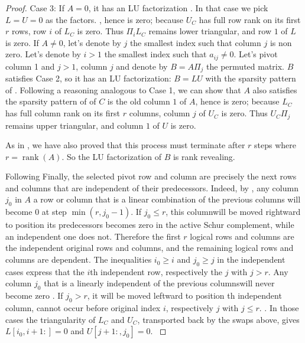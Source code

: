 \documentclass[10pt,twoside]{siamart1116}
\DeclareMathOperator{\rk}{rank}
\numberwithin{theorem}{section}
\providecommand{\DIFadd}[1]{{\protect\color{blue} \sf #1}} %
\providecommand{\DIFdel}[1]{{\protect\color{red} \scriptsize #1}} %
\providecommand{\DIFaddbegin}{} %
\providecommand{\DIFaddend}{} %
\providecommand{\DIFdelbegin}{} %
\providecommand{\DIFdelend}{} %
\begin{document}
\begin{proof}
\DIFdel{Case 3: If $A = 0$, it has an LU factorization . In that case we pick $L=U=0$ as the factors. }\DIFdelend \DIFaddbegin \DIFadd{, hence is zero; because $U_C$ has full row rank on its first $r$ rows, row $i$ of $L_C$ is zero. Thus $\Pi_i L_C$ remains lower triangular, and row $1$ of $L$ is zero. }\DIFaddend If \DIFdelbegin \DIFdel{$A \neq 0$, let's denote by $j$ the smallest index such that column $j$ is non zero. Let's denote by $i > 1$ the smallest index such that $a_{ij} \neq 0$. Let's pivot column 1 and }\DIFdelend \DIFaddbegin \DIFadd{$j>1$, column }\DIFaddend $j$ \DIFdelbegin \DIFdel{and denote by $B = A \Pi_j$ the permuted matrix. $B$ satisfies Case 2, so it has an LU factorization: $B = L U$ with the sparsity pattern of }%
\DIFdel{. Following a reasoning analogous to Case 1, we can show that $A$ also satisfies the sparsity pattern of }%
\DIFdelend \DIFaddbegin \DIFadd{of $C$ is the old column $1$ of $A$, hence is zero; because $L_C$ has full column rank on its first $r$ columns, column $j$ of $U_C$ is zero. Thus $U_C\Pi_j$ remains upper triangular, and column $1$ of $U$ is zero}\DIFaddend .

  \DIFdelbegin \DIFdel{As in }%
\DIFdel{, we have also proved that this process must terminate after $r$ steps where $r = \rk(A)$. So the LU factorization of $B$ is rank revealing. }%

\DIFdel{Following }\DIFdelend \DIFaddbegin \DIFadd{Finally, the selected pivot row and column are precisely the next rows and columns that are independent of their predecessors. Indeed, by }\DIFaddend {}, \DIFdelbegin \DIFdel{any column $j_0$ in $A$ }\DIFdelend \DIFaddbegin \DIFadd{a row or column }\DIFaddend that is a linear combination of \DIFdelbegin \DIFdel{the previous columns will become 0 at step $\min(r,j_0-1)$. If $j_0 \le r$, this columnwill be moved rightward to position }\DIFdelend \DIFaddbegin \DIFadd{its predecessors becomes zero in the active Schur complement, while an independent one does not. Therefore the first $r$ logical rows and columns are the independent original rows and columns, and the remaining logical rows and columns are dependent. The inequalities $i_0 \ge i$ and $j_0 \ge j$ in the independent cases express that the $i$th independent row, respectively the }\DIFaddend $j$\DIFdelbegin \DIFdel{with $j > r$. Any column $j_0$ that is a linearly independent of the previous columnswill never become zero . If $j_0 > r$, it will be moved leftward to position }\DIFdelend \DIFaddbegin \DIFadd{th independent column, cannot occur before original index $i$, respectively }\DIFaddend $j$\DIFdelbegin \DIFdel{with $j \le r$. }\DIFdelend \DIFaddbegin \DIFadd{. In those cases the triangularity of $L_C$ and $U_C$, transported back by the swaps above, gives $L[i_0,i+1:]=0$ and $U[j+1:,j_0]=0$.
}\DIFaddend 


\end{proof}
\end{document}
